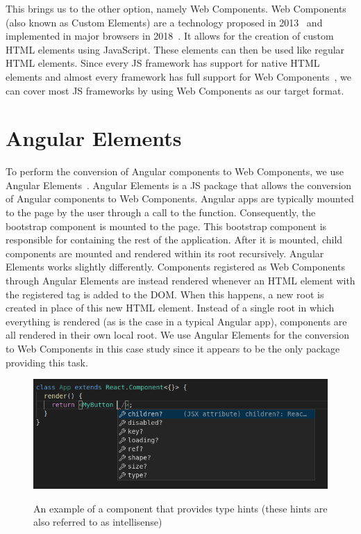This brings us to the other option, namely Web Components. Web Components (also known as Custom Elements) are a technology proposed in 2013~ and implemented in major browsers in 2018~. It allows for the creation of custom HTML elements using JavaScript. These elements can then be used like regular HTML elements. Since every JS framework has support for native HTML elements and almost every framework has full support for Web Components~, we can cover most JS frameworks by using Web Components as our target format.

\section{Angular Elements}\label{sec:bg:angularelements}
To perform the conversion of Angular components to Web Components, we use Angular Elements~. Angular Elements is a JS package that allows the conversion of Angular components to Web Components. Angular apps are typically mounted to the page by the user through a call to the  function. Consequently, the bootstrap component is mounted to the page. This bootstrap component is responsible for containing the rest of the application. After it is mounted, child components are mounted and rendered within its root recursively. Angular Elements works slightly differently. Components registered as Web Components through Angular Elements are instead rendered whenever an HTML element with the registered tag is added to the DOM\@. When this happens, a new root is created in place of this new HTML element. Instead of a single root in which everything is rendered (as is the case in a typical Angular app), components are all rendered in their own local root. We use Angular Elements for the conversion to Web Components in this case study since it appears to be the only package providing this task.

\begin{figure}[h]
  \caption{An example of a component that provides type hints (these hints are also referred to as intellisense)}
  \includegraphics[width=\columnwidth]{figures/background/hinting.png}
  \label{fig:bg:hinting}
  \centering
\end{figure}

